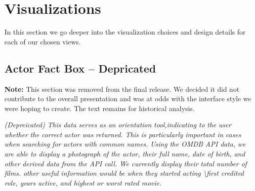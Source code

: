 \documentclass[12pt]{article}
\begin{document}
\newpage 

\section{Visualizations}

In this section we go deeper into the visualization choices and design details for each of our chosen views.



\subsection{Actor Fact Box -- Depricated}

\textbf{Note:}  This section was removed from the final release. We decided it did not contribute to the overall presentation and was at odds with the interface style we were hoping to create.  The text remains for  historical analysis.


\textit{ (Depreicated)	This data serves as an orientation tool,indicating to the user whether the correct actor was returned.  This is particularly important in cases when searching for actors with common names.  Using the OMDB API data, we are able to display a photograph of the actor, their full name, date of birth, and other derived data from the API call.  We currently display their total number of films.  other useful information would be when they started acting \textbackslash first credited role, years active, and highest or worst rated movie.}
	
\end{document}
